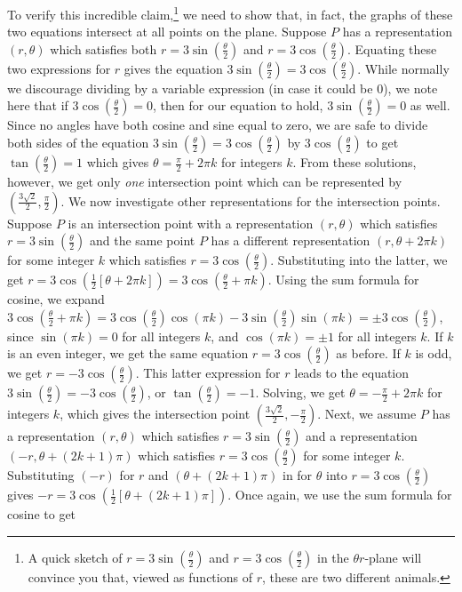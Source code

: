\begin{ex}
\begin{enumerate}
To verify this incredible claim,\footnote{A quick sketch of $r =  3\sin\left(\frac{\theta}{2}\right)$ and $r= 3\cos\left(\frac{\theta}{2}\right)$ in the $\theta r$-plane will convince you that, viewed as functions of $r$, these are two different animals.} we need to show that, in fact, the graphs of these two equations intersect at all points on the plane.  Suppose $P$ has a representation $(r,\theta)$ which satisfies both $r = 3\sin\left(\frac{\theta}{2}\right)$ and $r = 3\cos\left(\frac{\theta}{2}\right)$.  Equating these two expressions for $r$ gives the equation $3\sin\left(\frac{\theta}{2}\right) =  3\cos\left(\frac{\theta}{2}\right)$.  While normally we discourage dividing by a variable expression (in case it could be $0$), we note here that if $3\cos\left(\frac{\theta}{2}\right) = 0$, then for our equation to hold, $ 3\sin\left(\frac{\theta}{2}\right) = 0$ as well.  Since no angles have both cosine and sine equal to zero, we are safe to divide both sides of the equation  $3\sin\left(\frac{\theta}{2}\right) =  3\cos\left(\frac{\theta}{2}\right)$ by  $3\cos\left(\frac{\theta}{2}\right)$ to get $\tan\left(\frac{\theta}{2}\right) = 1$ which gives  $\theta =  \frac{\pi}{2} + 2\pi k$ for integers $k$. From these solutions, however, we get only \textit{one} intersection point which can be represented by $\left( \frac{3\sqrt{2}}{2}, \frac{\pi}{2}\right)$.  We now investigate other representations for the intersection points.  Suppose $P$ is an intersection point with a representation $(r,\theta)$ which satisfies $r =  3\sin\left(\frac{\theta}{2}\right)$ and the same point $P$ has a  different representation $(r, \theta + 2\pi k)$ for some integer $k$ which satisfies $r =  3\cos\left(\frac{\theta}{2}\right)$.  Substituting into the latter, we get $r = 3\cos\left(\frac{1}{2} \left[ \theta + 2\pi k\right]\right) = 3\cos\left(\frac{\theta}{2} + \pi k\right)$.  Using the sum formula for cosine, we expand  $3\cos\left(\frac{\theta}{2} + \pi k\right) = 3\cos\left(\frac{\theta}{2}\right) \cos(\pi k) - 3\sin\left(\frac{\theta}{2}\right)\sin\left(\pi k\right) = \pm 3\cos\left(\frac{\theta}{2}\right)$, since $\sin(\pi k) = 0$ for all integers $k$, and $\cos\left(\pi k\right) = \pm 1$ for all integers $k$.  If $k$ is an even integer, we get the same equation $r = 3\cos\left(\frac{\theta}{2}\right)$ as before.  If $k$ is odd, we get $r = -3\cos\left(\frac{\theta}{2}\right)$.  This latter expression for $r$ leads to the equation $3\sin\left(\frac{\theta}{2}\right) = -3\cos\left(\frac{\theta}{2}\right)$, or $\tan\left(\frac{\theta}{2}\right) = -1$.  Solving, we get $\theta = -\frac{\pi}{2} + 2\pi k$ for integers $k$, which gives the intersection point $\left(\frac{3\sqrt{2}}{2},-\frac{\pi}{2}\right)$.  Next, we assume $P$ has a representation $(r,\theta)$ which satisfies $r=3\sin\left(\frac{\theta}{2}\right)$ and  a representation $(-r, \theta + (2k+1)\pi)$ which satisfies $r = 3\cos\left(\frac{\theta}{2}\right)$ for some integer $k$.  Substituting $(-r)$ for $r$ and $(\theta + (2k+1)\pi)$ in for $\theta$ into $r = 3\cos\left(\frac{\theta}{2}\right)$ gives  $-r = 3\cos\left(\frac{1}{2}\left[ \theta + (2k+1)\pi\right]\right)$.  Once again, we use the sum formula for cosine to get


\end{enumerate}
\end{ex}
